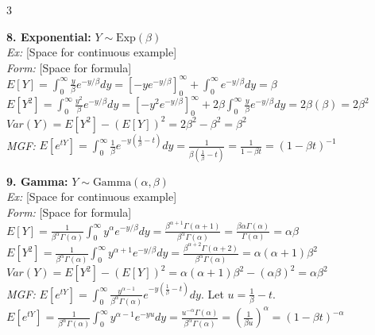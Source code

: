 \documentclass[10pt]{article}
\begin{document}
\begin{multicols*}{3}
\vspace{2mm}

\textbf{8. Exponential:} $Y \sim \text{Exp}(\beta)$\\
\textit{Ex:} [Space for continuous example]\\
\textit{Form:} [Space for formula]\\
$E[Y] = \int_{0}^{\infty} \frac{y}{\beta} e^{-y/\beta} dy = [-y e^{-y/\beta}]_{0}^{\infty} + \int_{0}^{\infty} e^{-y/\beta} dy = \beta$\\
$E[Y^2] = \int_{0}^{\infty} \frac{y^2}{\beta} e^{-y/\beta} dy = [-y^2 e^{-y/\beta}]_{0}^{\infty} + 2\beta \int_{0}^{\infty} \frac{y}{\beta} e^{-y/\beta} dy = 2\beta(\beta) = 2\beta^2$\\
$Var(Y) = E[Y^2] - (E[Y])^2 = 2\beta^2 - \beta^2 = \beta^2$\\
\textit{MGF:} $E[e^{tY}] = \int_{0}^{\infty} \frac{1}{\beta} e^{-y(\frac{1}{\beta}-t)} dy = \frac{1}{\beta(\frac{1}{\beta}-t)} = \frac{1}{1-\beta t} = (1-\beta t)^{-1}$

\vspace{2mm}

\textbf{9. Gamma:} $Y \sim \text{Gamma}(\alpha, \beta)$\\
\textit{Ex:} [Space for continuous example]\\
\textit{Form:} [Space for formula]\\
$E[Y] = \frac{1}{\beta^\alpha \Gamma(\alpha)} \int_{0}^{\infty} y^{\alpha} e^{-y/\beta} dy = \frac{\beta^{\alpha+1} \Gamma(\alpha+1)}{\beta^\alpha \Gamma(\alpha)} = \frac{\beta \alpha \Gamma(\alpha)}{\Gamma(\alpha)} = \alpha\beta$\\
$E[Y^2] = \frac{1}{\beta^\alpha \Gamma(\alpha)} \int_{0}^{\infty} y^{\alpha+1} e^{-y/\beta} dy = \frac{\beta^{\alpha+2} \Gamma(\alpha+2)}{\beta^\alpha \Gamma(\alpha)} = \alpha(\alpha+1)\beta^2$\\
$Var(Y) = E[Y^2] - (E[Y])^2 = \alpha(\alpha+1)\beta^2 - (\alpha\beta)^2 = \alpha\beta^2$\\
\textit{MGF:} $E[e^{tY}] = \int_{0}^{\infty} \frac{y^{\alpha-1}}{\beta^\alpha \Gamma(\alpha)} e^{-y(\frac{1}{\beta}-t)} dy$. Let $u = \frac{1}{\beta}-t$.\\
$E[e^{tY}] = \frac{1}{\beta^\alpha \Gamma(\alpha)} \int_{0}^{\infty} y^{\alpha-1} e^{-yu} dy = \frac{u^{-\alpha} \Gamma(\alpha)}{\beta^\alpha \Gamma(\alpha)} = (\frac{1}{\beta u})^\alpha = (1-\beta t)^{-\alpha}$

\vspace{2mm}


\end{multicols*}
\end{document}
